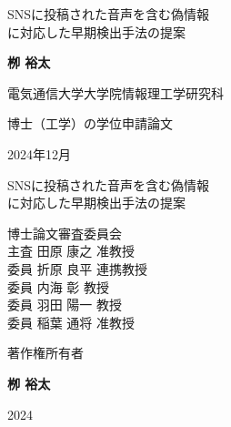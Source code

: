 \documentclass[a4paper,twoside,12pt,uplatex]{jsreport}    %
\theoremstyle{definition}%
\begin{document}
\baselineskip 22pt

\begin{titlepage}
  \Large
  \begin{center}
   {\LARGE     %
      SNSに投稿された音声を含む偽情報\\に対応した早期検出手法の提案
    }
  \end{center}
  \vspace{60mm}
  \centerline{\bf 栁 裕太}
  \vspace{20mm}
  \centerline{電気通信大学大学院情報理工学研究科}
  \centerline{博士（工学）の学位申請論文}
  \vspace{25mm}
  \centerline{\large 2024年12月}


  \cleardoublepage
  \begin{center}
   {\LARGE     %
      SNSに投稿された音声を含む偽情報\\に対応した早期検出手法の提案
    }
  \end{center}
  \vspace{60mm}
  \hspace{50mm}博士論文審査委員会\\
  \hspace{60mm}主査 \hspace{6mm} 田原 康之\hspace{3mm} 准教授\\
  \hspace{60mm}委員 \hspace{6mm} 折原 良平\hspace{3mm} 連携教授\\
  \hspace{60mm}委員 \hspace{6mm} 内海 彰 \hspace{6mm} 教授\\
  \hspace{60mm}委員 \hspace{6mm} 羽田 陽一\hspace{3mm} 教授\\
  \hspace{60mm}委員 \hspace{6mm} 稲葉 通将\hspace{3mm} 准教授\\
  \thispagestyle{empty}
  \cleardoublepage
  \vspace*{70mm}
  \centerline{\LARGE 著作権所有者}
  \vspace{20mm}
  \centerline{\bf 栁 裕太}
  \vspace{10mm}
  \centerline{\large 2024}
  \thispagestyle{empty}
\end{titlepage}
\thispagestyle{empty}

\end{document}
